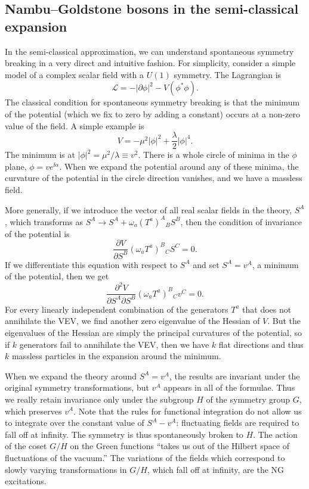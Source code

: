 \subsection{Nambu--Goldstone bosons in the semi-classical expansion}

In the semi-classical approximation, we can understand spontaneous symmetry
breaking in a very direct and intuitive fashion. For simplicity, consider a
simple model of a complex scalar field with a $U(1)$ symmetry. The Lagrangian is
\begin{equation*}
  \mathcal L=-|\partial\phi|^2-V(\phi^*\phi).
\end{equation*}
The classical condition for spontaneous symmetry breaking is that the minimum
of the potential (which we fix to zero by adding a constant) occurs at a
non-zero value of the field. A simple example is
\begin{equation*}
  V=-\mu^2|\phi|^2+\frac{\lambda}{2}|\phi|^4.
\end{equation*}
The minimum is at $|\phi|^2=\mu^2/\lambda\equiv v^2$. There is a whole circle
of minima in the $\phi$ plane, $\phi=ve^{\ii\alpha}$. When we expand the
potential around any of these minima, the curvature of the potential in the
circle direction vanishes, and we have a massless field.

More generally, if we introduce the vector of all real scalar fields in the
theory, $S^A$, which transforms as
$S^A\to S^A+\omega_a(T^a)^A{}_B S^B$, then the condition of invariance of the
potential is
\begin{equation*}
  \frac{\partial V}{\partial S^B}(\omega_aT^a)^B{}_C S^C=0.
\end{equation*}
If we differentiate this equation with respect to $S^A$ and set $S^A=v^A$, a
minimum of the potential, then we get
\begin{equation*}
  \frac{\partial^2V}{\partial S^A\partial S^B}(\omega_aT^a)^B{}_C v^C=0.
\end{equation*}
For every linearly independent combination of the generators $T^a$ that does
not annihilate the VEV, we find another zero eigenvalue of the Hessian of $V$.
But the eigenvalues of the Hessian are simply the principal curvatures of the
potential, so if $k$ generators fail to annihilate the VEV, then we have $k$
flat directions and thus $k$ massless particles in the expansion around the
minimum.

When we expand the theory around $S^A=v^A$, the results are invariant under the
original symmetry transformations, but $v^A$ appears in all of the formulae.
Thus we really retain invariance only under the subgroup $H$ of the symmetry
group $G$, which preserves $v^A$. Note that the rules for functional integration
do not allow us to integrate over the constant value of $S^A-v^A$: fluctuating
fields are required to fall off at infinity. The symmetry is thus spontaneously
broken to $H$. The action of the coset $G/H$ on the Green functions ``takes us
out of the Hilbert space of fluctuations of the vacuum.'' The variations of the
fields which correspond to slowly varying transformations in $G/H$, which fall
off at infinity, are the NG excitations.

